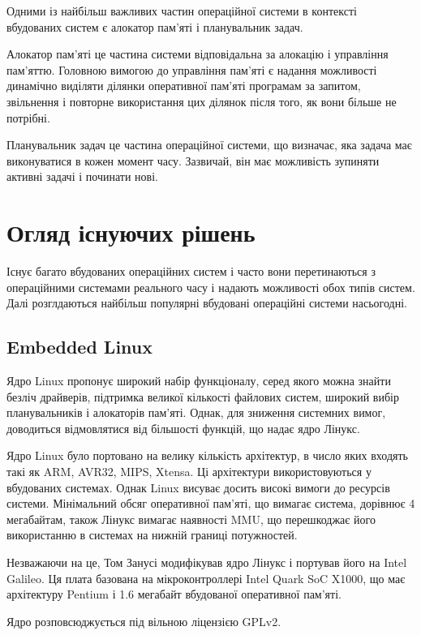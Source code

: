 \documentclass[oneside,14pt,a4paper,final]{myextreport}
\begin{document}
Одними із найбільш важливих частин операційної системи в контексті вбудованих систем є алокатор пам'яті і планувальник задач.

Алокатор пам'яті це частина системи відповідальна за алокацію і управління пам'яттю. Головною вимогою до управління пам'яті є надання можливості динамічно виділяти ділянки оперативної пам'яті програмам за запитом, звільнення і повторне використання цих ділянок після того, як вони більше не потрібні.

Планувальник задач це частина операційної системи, що визначає, яка задача має виконуватися в кожен момент часу. Зазвичай, він має можливість зупиняти активні задачі і починати нові.

\section{Огляд існуючих рішень}\label{existing-solutions}
Існує багато вбудованих операційних систем і часто вони перетинаються з операційними системами реального часу і надають можливості обох типів систем. Далі розглдаються найбільш популярні вбудовані операційні системи насьогодні.

\subsection{Embedded Linux}

Ядро Linux\cite{linux} пропонує широкий набір функціоналу, серед якого можна знайти безліч драйверів, підтримка великої кількості файлових систем, широкий вибір планувальників і алокаторів пам'яті. Однак, для зниження системних вимог, доводиться відмовлятися від більшості функцій, що надає ядро Лінукс.

Ядро Linux було портовано на велику кількість архітектур, в число яких входять такі як ARM, AVR32, MIPS, Xtensa. Ці архітектури використовуються у вбудованих системах. Однак Linux висуває досить високі вимоги до ресурсів системи. Мінімальний обсяг оперативної пам'яті, що вимагає система, дорівнює 4 мегабайтам, також Лінукс вимагає наявності \ac{MMU}, що перешкоджає його використанню в системах на нижній границі потужностей.

Незважаючи на це, Том Занусі модифікував ядро Лінукс і портував його на Intel Galileo\cite{linux-galileo}. Ця плата базована на мікроконтроллері Intel Quark SoC X1000, що має архітектуру Pentium і 1.6 мегабайт вбудованої оперативної пам'яті\cite{intel-galileo}.

Ядро розповсюджується під вільною ліцензією GPLv2.
\end{document}
